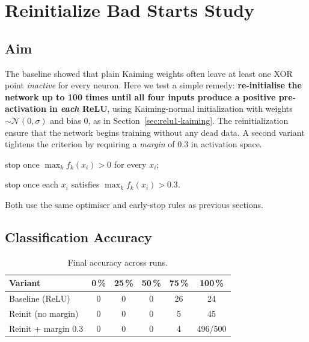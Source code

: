 \section{Reinitialize Bad Starts Study}
\label{sec:relu1-reinit}

\subsection*{Aim}
The baseline showed that plain Kaiming weights often leave at least one
XOR point \emph{inactive} for every neuron.  
Here we test a simple remedy: \textbf{re-initialise the network up to 100 times 
until all four inputs produce a positive pre-activation in \emph{each} ReLU}, 
using Kaiming-normal initialization with weights \(\sim \mathcal{N}(0, \sigma)\) and bias \(0\), as in Section~\ref{sec:relu1-kaiming}.
The reinitialization ensure that the network begins training without any dead data.
A second variant tightens the criterion by requiring a \emph{margin}
of $0.3$ in activation space.

\begin{description}[leftmargin=2em,style=sameline]
  \item[\texttt{relu1\_reinit}]   stop once \(\max_k f_k(x_i) > 0\) for every \(x_i\);
  \item[\texttt{relu1\_reinit\_margin}] stop once each \(x_i\) satisfies
        \(\max_k f_k(x_i) > 0.3\).
\end{description}
Both use the same optimiser and early-stop rules as previous sections.

\subsection*{Classification Accuracy}

\begin{table}[h]
\centering
\caption{Final accuracy across runs.}
\label{tab:relu1-reinit-accuracy}
\begin{tabular}{lccccc}
\toprule
Variant & 0\,\% & 25\,\% & 50\,\% & 75\,\% & 100\,\% \\
\midrule
Baseline (ReLU)       & 0 & 0 & 0 & 26 & 24 \\
Reinit (no margin)    & 0 & 0 & 0 & 5  & 45 \\
Reinit + margin 0.3   & 0 & 0 & 0 & 4  & 496/500 \\
\bottomrule
\end{tabular}
\end{table}


